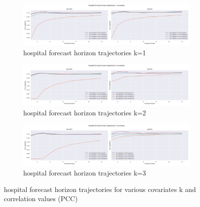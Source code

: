 \documentclass[letterpaper]{article}
\begin{document}
\begin{figure}[tbp]
\begin{subfigure}{\textwidth}
\centering
\includegraphics[width=\linewidth]{figures/base-lstm_seg-lstm_hospital_k_1_trajectory.png}
\caption{hospital forecast horizon trajectories k=1}
\label{fig:base-lstm_seg-lstm_hospital_k_1_trajectory}
\end{subfigure}

\begin{subfigure}{\textwidth}
\centering
\includegraphics[width=\linewidth]{figures/base-lstm_seg-lstm_hospital_k_2_trajectory.png}
\caption{hospital forecast horizon trajectories k=2}
\label{fig:base-lstm_seg-lstm_hospital_k_2_trajectory}
\end{subfigure}

\begin{subfigure}{\textwidth}
\centering
\includegraphics[width=\linewidth]{figures/base-lstm_seg-lstm_hospital_k_3_trajectory.png}
\caption{hospital forecast horizon trajectories k=3}
\label{fig:base-lstm_seg-lstm_hospital_k_3_trajectory}
\end{subfigure}
\caption{hospital forecast horizon trajectories for various covariates k and correlation values (PCC)}
\label{fig:base-lstm_seg-lstm_hospital_trajectory}
\end{figure}
\end{document}
